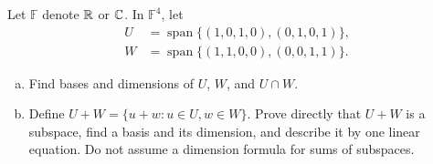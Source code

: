 \begin{exercise}
  \label{ex:hw01:intersections-and-sums}
  Let \(\mathbb F\) denote \(\mathbb{R}\) or \(\mathbb{C}\). In \(\mathbb F^4\), let
  \[
    \begin{aligned}
      U&=\operatorname{span}\{(1,0,1,0),(0,1,0,1)\},\\
      W&=\operatorname{span}\{(1,1,0,0),(0,0,1,1)\}.
    \end{aligned}
  \]
  \begin{enumerate}[(a)][2]
    \item Find bases and dimensions of \(U\), \(W\), and \(U\cap W\).
    \item Define \(U+W=\{u+w:u\in U,w\in W\}\). Prove directly that
      \(U+W\) is a subspace, find a basis and its dimension, and describe it
      by one linear equation. Do not assume a dimension formula for sums
      of subspaces.
  \end{enumerate}
\end{exercise}
